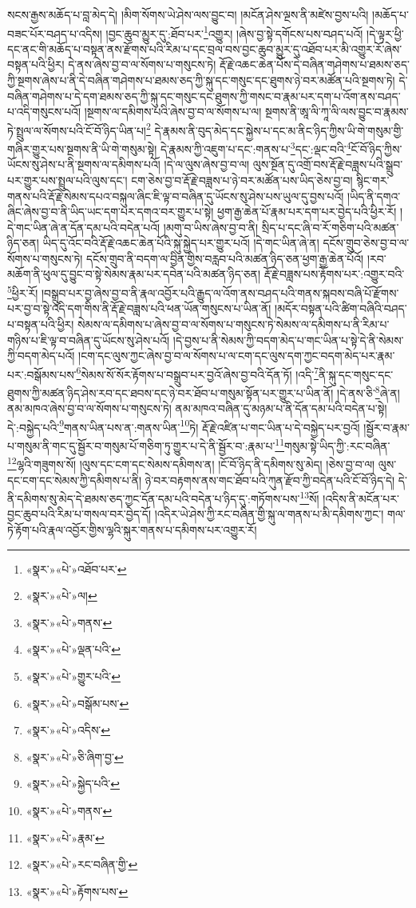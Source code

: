 སངས་རྒྱས་མཆོད་པ་བླ་མེད་དེ། །མིག་སོགས་ཡེ་ཤེས་ལས་བྱུང་བ། །མངོན་ཤེས་ལྔས་ནི་མཛེས་བྱས་པའི། །མཆོད་པ་བཟང་པོར་བཤད་པ་འདིས། །བྱང་ཆུབ་མྱུར་དུ་:ཐོབ་པར་\footnote{«སྣར་»«པེ་»འཐོབ་པར་}འགྱུར། །ཞེས་བྱ་སྟེ་དགོངས་པས་བཤད་པའོ། །དེ་ལྟར་ཕྱི་དང་ནང་གི་མཆོད་པ་བསྟན་ནས་རྫོགས་པའི་རིམ་པ་དང་བྲལ་བས་བྱང་ཆུབ་མྱུར་དུ་འཐོབ་པར་མི་འགྱུར་རོ་ཞེས་བསྟན་པའི་ཕྱིར། དེ་ནས་ཞེས་བྱ་བ་ལ་སོགས་པ་གསུངས་ཏེ། རྡོ་རྗེ་འཆང་ཆེན་པོས་དེ་བཞིན་གཤེགས་པ་ཐམས་ཅད་ཀྱི་སྔགས་ཞེས་པ་ནི་དེ་བཞིན་གཤེགས་པ་ཐམས་ཅད་ཀྱི་སྐུ་དང་གསུང་དང་ཐུགས་ཉེ་བར་མཚོན་པའི་སྔགས་ཏེ། དེ་བཞིན་གཤེགས་པ་དེ་དག་ཐམས་ཅད་ཀྱི་སྐུ་དང་གསུང་དང་ཐུགས་ཀྱི་གསང་བ་རྣམ་པར་དག་པ་འོག་ནས་བཤད་པ་འདི་གསུངས་པའོ། །སྔགས་ལ་དམིགས་པའི་ཞེས་བྱ་བ་ལ་སོགས་པ་ལ། སྔགས་ནི་ཨཱ་ལི་ཀཱ་ལི་ལས་བྱུང་བ་རྣམས་ཏེ་སྤྲུལ་ལ་སོགས་པའི་ངོ་བོ་ཉིད་ཡིན་པ།\footnote{«སྣར་»«པེ་»ལ།} དེ་རྣམས་ནི་བུད་མེད་དང་སྐྱེས་པ་དང་མ་ནིང་ཉིད་ཀྱིས་ཡི་གེ་གསུམ་གྱི་གཞིར་གྱུར་པས་སྔགས་ནི་ཡི་གེ་གསུམ་སྟེ། དེ་རྣམས་ཀྱི་འཇུག་པ་དང་:གནས་པ་\footnote{«སྣར་»«པེ་»གནས་}དང་:ལྡང་བའི་\footnote{«སྣར་»«པེ་»ལྡན་པའི་}ངོ་བོ་ཉིད་ཀྱིས་ཡོངས་སུ་ཤེས་པ་ནི་སྔགས་ལ་དམིགས་པའོ། །དེ་ལ་ལུས་ཞེས་བྱ་བ་ལ། ལུས་སྔོན་དུ་འགྲོ་བས་རྡོ་རྗེ་བཟླས་པའི་སྒྲུབ་པར་གྱུར་པས་སྤྲུལ་པའི་ལུས་དང་། ངག་ཅེས་བྱ་བ་རྡོ་རྗེ་བཟླས་པ་ཉེ་བར་མཚོན་པས་ཡིད་ཅེས་བྱ་བ། སྙིང་གར་གནས་པའི་རྡོ་རྗེ་སེམས་དཔའ་བསྐུལ་ཞིང་ཇི་ལྟ་བ་བཞིན་དུ་ཡོངས་སུ་ཤེས་པས་ཡུལ་དུ་བྱས་པའོ། །ཡིད་ནི་དགའ་ཞིང་ཞེས་བྱ་བ་ནི་ཡིད་ཡང་དག་པར་དགའ་བར་གྱུར་པ་སྟེ། ཕྱག་རྒྱ་ཆེན་པོ་རྣམ་པར་དག་པར་བྱེད་པའི་ཕྱིར་རོ། །དེ་གང་ཡིན་ཞེ་ན་དོན་དམ་པའི་བདེན་པའོ། །མགུ་བ་ཡིས་ཞེས་བྱ་བ་ནི། སྲིད་པ་དང་ཞི་བ་རོ་གཅིག་པའི་མཚན་ཉིད་ཅན། ཡིད་དུ་འོང་བའི་རྡོ་རྗེ་འཆང་ཆེན་པོའི་སྐུ་སྐྱེད་པར་གྱུར་པའོ། །དེ་གང་ཡིན་ཞེ་ན། དངོས་གྲུབ་ཅེས་བྱ་བ་ལ་སོགས་པ་གསུངས་ཏེ། དངོས་གྲུབ་ནི་བདག་ལ་བྱིན་གྱིས་བརླབ་པའི་མཚན་ཉིད་ཅན་ཕྱག་རྒྱ་ཆེན་པོའོ། །རབ་མཆོག་ནི་ཕུལ་དུ་བྱུང་བ་སྟེ་སེམས་རྣམ་པར་དབེན་པའི་མཚན་ཉིད་ཅན། རྡོ་རྗེ་བཟླས་པས་རྟོགས་པར་:འགྱུར་བའི་\footnote{«སྣར་»«པེ་»གྱུར་པའི་}ཕྱིར་རོ། །བསྒྲུབ་པར་བྱ་ཞེས་བྱ་བ་ནི་རྣལ་འབྱོར་པའི་རྒྱུད་ལ་འོག་ནས་བཤད་པའི་གནས་སྐབས་བཞི་པོ་རྫོགས་པར་བྱ་བ་སྟེ་འདི་དག་གིས་ནི་རྡོ་རྗེ་བཟླས་པའི་ཕན་ཡོན་གསུངས་པ་ཡིན་ནོ། །མདོར་བསྟན་པའི་ཚིག་བཞིའི་བཤད་པ་བསྟན་པའི་ཕྱིར། སེམས་ལ་དམིགས་པ་ཞེས་བྱ་བ་ལ་སོགས་པ་གསུངས་ཏེ་སེམས་ལ་དམིགས་པ་ནི་རིམ་པ་གཉིས་པ་ཇི་ལྟ་བ་བཞིན་དུ་ཡོངས་སུ་ཤེས་པའོ། །དེ་བྱས་པ་ནི་སེམས་ཀྱི་བདག་མེད་པ་གང་ཡིན་པ་སྟེ་དེ་ནི་སེམས་ཀྱི་བདག་མེད་པའོ། །ངག་དང་ལུས་ཀྱང་ཞེས་བྱ་བ་ལ་སོགས་པ་ལ་ངག་དང་ལུས་དག་ཀྱང་བདག་མེད་པར་རྣམ་པར་:བསྒོམས་པས་\footnote{«སྣར་»«པེ་»བསྒོམ་པས་}སེམས་སོ་སོར་རྟོགས་པ་བསྒྲུབ་པར་བྱའོ་ཞེས་བྱ་བའི་དོན་ཏོ། །འདི་\footnote{«སྣར་»«པེ་»འདིས་}ནི་སྐུ་དང་གསུང་དང་ཐུགས་ཀྱི་མཚན་ཉིད་ཤེས་རབ་དང་ཐབས་དང་ཉེ་བར་ཐོབ་པ་གསུམ་སྟོན་པར་གྱུར་པ་ཡིན་ནོ། །དེ་ནས་ཅི་\footnote{«སྣར་»«པེ་»ཅི་ཞིག་བྱ་}ཞེ་ན། ནམ་མཁའ་ཞེས་བྱ་བ་ལ་སོགས་པ་གསུངས་ཏེ། ནམ་མཁའ་བཞིན་དུ་མཉམ་པ་ནི་དོན་དམ་པའི་བདེན་པ་སྟེ། དེ་:བསྐྱེད་པའི་\footnote{«སྣར་»«པེ་»སྐྱེད་པའི་}གནས་ཡིན་པས་ན་:གནས་ཡིན་\footnote{«སྣར་»«པེ་»གནས་}ཏེ། རྡོ་རྗེ་འཛིན་པ་གང་ཡིན་པ་དེ་བསྐྱེད་པར་བྱའོ། །སྦྱོར་བ་རྣམ་པ་གསུམ་ནི་གང་དུ་སྦྱོར་བ་གསུམ་པོ་གཅིག་ཏུ་གྱུར་པ་དེ་ནི་སྦྱོར་བ་:རྣམ་པ་\footnote{«སྣར་»«པེ་»རྣམ་}གསུམ་སྟེ་ཡིད་ཀྱི་:རང་བཞིན་\footnote{«སྣར་»«པེ་»རང་བཞིན་གྱི་}ལྷའི་གཟུགས་སོ། །ལུས་དང་ངག་དང་སེམས་དམིགས་ན། །ངོ་བོ་ཉིད་ནི་དམིགས་སུ་མེད། །ཅེས་བྱ་བ་ལ། ལུས་དང་ངག་དང་སེམས་ཀྱི་དམིགས་པ་ནི། ཉེ་བར་བརྟགས་ནས་གང་ཐོབ་པའི་ཀུན་རྫོབ་ཀྱི་བདེན་པའི་ངོ་བོ་ཉིད་དེ། དེ་ནི་དམིགས་སུ་མེད་དེ་ཐམས་ཅད་ཀྱང་དོན་དམ་པའི་བདེན་པ་ཉིད་དུ་:གཏོགས་པས་\footnote{«སྣར་»«པེ་»རྟོགས་པས་}སོ། །འདིས་ནི་མངོན་པར་བྱང་ཆུབ་པའི་རིམ་པ་གསལ་བར་བྱེད་དོ། །འདིར་ཡེ་ཤེས་ཀྱི་རང་བཞིན་གྱི་སྐུ་ལ་གནས་པ་མི་དམིགས་ཀྱང་། གལ་ཏེ་རྟོག་པའི་རྣལ་འབྱོར་གྱིས་ལྷའི་སྐུར་གནས་པ་དམིགས་པར་འགྱུར་རོ། 